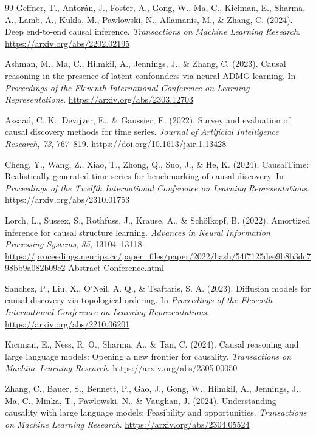 \begin{thebibliography}{99}
 Geffner, T., Antorán, J., Foster, A., Gong, W., Ma, C., Kiciman, E., Sharma, A., Lamb, A., Kukla, M., Pawlowski, N., Allamanis, M., \& Zhang, C. (2024). Deep end-to-end causal inference. \textit{Transactions on Machine Learning Research}. \url{https://arxiv.org/abs/2202.02195}

 Ashman, M., Ma, C., Hilmkil, A., Jennings, J., \& Zhang, C. (2023). Causal reasoning in the presence of latent confounders via neural ADMG learning. In \textit{Proceedings of the Eleventh International Conference on Learning Representations}. \url{https://arxiv.org/abs/2303.12703}

 Assaad, C. K., Devijver, E., \& Gaussier, E. (2022). Survey and evaluation of causal discovery methods for time series. \textit{Journal of Artificial Intelligence Research}, \textit{73}, 767--819. \url{https://doi.org/10.1613/jair.1.13428}

 Cheng, Y., Wang, Z., Xiao, T., Zhong, Q., Suo, J., \& He, K. (2024). CausalTime: Realistically generated time-series for benchmarking of causal discovery. In \textit{Proceedings of the Twelfth International Conference on Learning Representations}. \url{https://arxiv.org/abs/2310.01753}

 Lorch, L., Sussex, S., Rothfuss, J., Krause, A., \& Sch{\"o}lkopf, B. (2022). Amortized inference for causal structure learning. \textit{Advances in Neural Information Processing Systems}, \textit{35}, 13104--13118. \url{https://proceedings.neurips.cc/paper_files/paper/2022/hash/54f7125dee9b8b3dc798bb9a082b09e2-Abstract-Conference.html}

 Sanchez, P., Liu, X., O'Neil, A. Q., \& Tsaftaris, S. A. (2023). Diffusion models for causal discovery via topological ordering. In \textit{Proceedings of the Eleventh International Conference on Learning Representations}. \url{https://arxiv.org/abs/2210.06201}

 K{\i}c{\i}man, E., Ness, R. O., Sharma, A., \& Tan, C. (2024). Causal reasoning and large language models: Opening a new frontier for causality. \textit{Transactions on Machine Learning Research}. \url{https://arxiv.org/abs/2305.00050}

 Zhang, C., Bauer, S., Bennett, P., Gao, J., Gong, W., Hilmkil, A., Jennings, J., Ma, C., Minka, T., Pawlowski, N., \& Vaughan, J. (2024). Understanding causality with large language models: Feasibility and opportunities. \textit{Transactions on Machine Learning Research}. \url{https://arxiv.org/abs/2304.05524}


\end{thebibliography}
